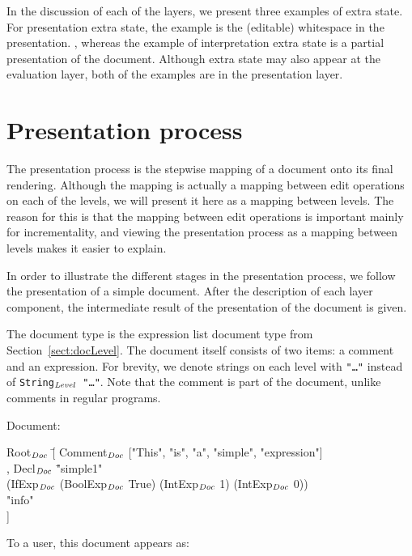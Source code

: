 \documentclass{speauth}
\begin{document}
\bc
In the discussion of each of the layers, we present three examples of extra state. For presentation extra state, the example is the (editable) whitespace in the presentation. , whereas the example of interpretation extra state is a partial presentation of the document. Although extra state may also appear at the evaluation layer, both of the examples are in the presentation layer. 
\ec


%																
%																
%																
\section{Presentation process} \label{sect:presprocess}

The presentation process is the stepwise mapping of a document onto its final rendering. Although the mapping is actually a mapping between edit operations on each of the levels, we will present it here as a mapping between levels. The reason for this is that the mapping between edit operations is important mainly for incrementality, and viewing the presentation process as a mapping between levels makes it easier to explain.

In order to illustrate the different stages in the presentation process, we follow the presentation of a simple document. After the description of each layer component, the intermediate result of the presentation of the document is given. 

The document type is the expression list document type from Section~\ref{sect:docLevel}. The document itself consists of two items: a comment and an expression. For brevity, we denote strings on each level with {\tt "\dots"} instead of {\tt String$_{\mathit{Level}}$ "\dots"}. Note that the comment is part of the document, unlike comments in regular programs.

Document:
\small \ttfamily
\begin{tabbing}
Root$_{\mathit{Doc}}$ \= [ Comment$_{\mathit{Doc}}$ ["This", "is", "a", "simple", "expression"] \\
       \> , Decl$_{\mathit{Doc}}$ \= "simple1" \\
       \>                        \>(IfExp$_{\mathit{Doc}}$ (BoolExp$_{\mathit{Doc}}$ True) (IntExp$_{\mathit{Doc}}$ 1) (IntExp$_{\mathit{Doc}}$ 0))\\
       \>                        \> "info"\\
       \> ] 
\end{tabbing}
\rmfamily \normalsize

To a user, this document appears as:\\
\end{document}
